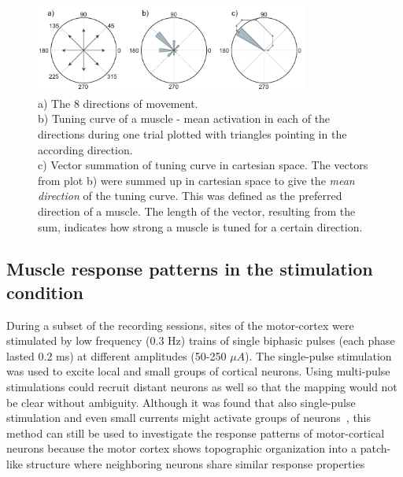 \begin{figure}[ht]
	\centering
		\includegraphics[width=0.8\textwidth]{images/pd.jpg}
	\caption
	{
	a) The 8 directions of movement. \\
	b) Tuning curve of a muscle - mean activation in each of the directions during one trial plotted with triangles pointing in the according direction. \\
	c) Vector summation of tuning curve in cartesian space. The vectors from plot b) were summed up in cartesian space to give the \emph{mean direction} of the tuning curve. This was defined as the preferred direction of a muscle. The length of the vector, resulting from the sum, indicates how strong a muscle is tuned for a certain direction.\\
	}
	\label{sg:fig:images_pd}
\end{figure}



% 
\subsection{Muscle response patterns in the stimulation condition} %
\label{sg:sub:evoked_responses}

During a subset of the recording sessions, sites of the motor-cortex were stimulated by low frequency (0.3 Hz) trains of single biphasic pulses (each phase lasted 0.2 ms) at different amplitudes (50-250 $\mu A$). The single-pulse stimulation was used to excite local and small groups of cortical neurons. Using multi-pulse stimulations could recruit distant neurons as well so that the mapping would not be clear without ambiguity. Although it was found that also single-pulse stimulation and even small currents might activate groups of neurons~\citep{Tehovnik:1996p3982}, this method can still be used to investigate the response patterns of motor-cortical neurons because the motor cortex shows topographic organization into a patch-like structure where neighboring neurons share similar response properties~\citep{Lee:1998p4164}


